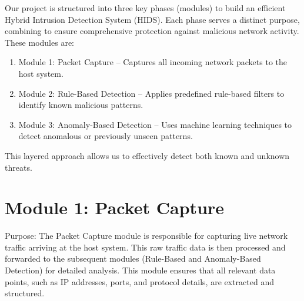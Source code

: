\documentclass[oneside, english]{reports/assets/sdqtechreport}
\begin{document}
Our project is structured into three key phases (modules) to build an efficient
Hybrid Intrusion Detection System (HIDS). Each phase serves a distinct purpose,
combining to ensure comprehensive protection against malicious network
activity. These modules are:

\begin{enumerate}
	\item Module 1: Packet Capture – Captures all incoming network packets to the host
	      system.
	\item Module 2: Rule-Based Detection – Applies predefined rule-based filters to
	      identify known malicious patterns.
	\item Module 3: Anomaly-Based Detection – Uses machine learning techniques to detect
	      anomalous or previously unseen patterns.
\end{enumerate}

This layered approach allows us to effectively detect both known and unknown
threats.

\section{Module 1: Packet Capture}
\label{sec:PacketCapture}

Purpose: The Packet Capture module is responsible for capturing live network
traffic arriving at the host system. This raw traffic data is then processed
and forwarded to the subsequent modules (Rule-Based and Anomaly-Based
Detection) for detailed analysis. This module ensures that all relevant data
points, such as IP addresses, ports, and protocol details, are extracted and
structured.
\end{document}
